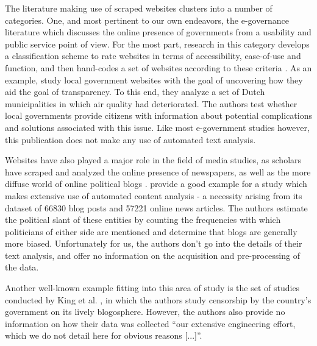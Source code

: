 \documentclass[11pt]{article}
\begin{document}
The literature making use of scraped websites clusters into a number of categories. One, and most pertinent to our own endeavors, the e-governance literature which discusses the online presence of governments from a usability and public service point of view. For the most part, research in this category develops a classification scheme to rate websites in terms of accessibility, ease-of-use and function, and then hand-codes a set of websites according to these criteria \citep{Urban2002,Armstrong2011,Feeney2017}. As an example, \cite{grimmelikhuijsen2012developing} study local government websites with the goal of uncovering how they aid the goal of transparency. To this end, they analyze a set of Dutch municipalities in which air quality had deteriorated. The authors test whether local governments provide citizens with information about potential complications and solutions associated with this issue. Like most e-government studies however, this publication does not make any use of automated text analysis.

Websites have also played a major role in the field of media studies, as scholars have scraped and analyzed the online presence of newspapers, as well as the more diffuse world of online political blogs \citep{Adamic2005,Gentzkow2010}. \cite{Lin2011} provide a good example for a study which makes extensive use of automated content analysis - a necessity arising from its dataset of 66830 blog posts and 57221 online news articles. The authors estimate the political slant of these entities by counting the frequencies with which politicians of either side are mentioned and determine that blogs are generally more biased. Unfortunately for us, the authors don't go into the details of their text analysis, and offer no information on the acquisition and pre-processing of the data.

Another well-known example fitting into this area of study is the set of studies conducted by King et al. \citep{KING2013,King2014,KING2017}, in which the authors study censorship by the country's government on its lively blogosphere. However, the authors also provide no information on how their data was collected ``our extensive engineering effort, which we do not detail here for obvious reasons [...]''.
\end{document}
